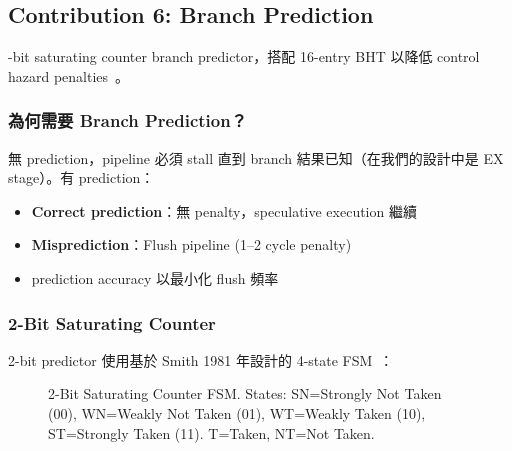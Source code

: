 \documentclass[journal]{IEEEtran}
\newcommand{\tagit}[1]{\textit{#1}}
\newcommand{\Goal}{\tagit{目標：}}
\begin{document}
\subsection{Contribution 6: Branch Prediction}

-bit saturating counter branch predictor，搭配 16-entry BHT 以降低 control hazard penalties~\cite{smith1981study}。

\subsubsection{為何需要 Branch Prediction？}
無 prediction，pipeline 必須 stall 直到 branch 結果已知（在我們的設計中是 EX stage）。有 prediction：
\begin{itemize}
    \item \textbf{Correct prediction}：無 penalty，speculative execution 繼續
    \item \textbf{Misprediction}：Flush pipeline (1--2 cycle penalty)
    \item {} prediction accuracy 以最小化 flush 頻率
\end{itemize}

\subsubsection{2-Bit Saturating Counter}
2-bit predictor 使用基於 Smith 1981 年設計的 4-state FSM~\cite{smith1981study}：

\begin{figure}[!t]
\centering
{}
\caption{2-Bit Saturating Counter FSM. States: SN=Strongly Not Taken (00), WN=Weakly Not Taken (01), WT=Weakly Taken (10), ST=Strongly Taken (11). T=Taken, NT=Not Taken.}
\label{fig:bp}
\end{figure}
\end{document}
